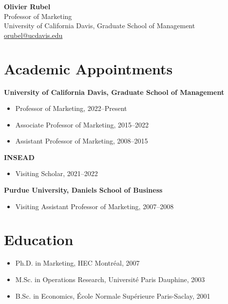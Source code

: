 \documentclass[10pt]{article}
\begin{document}

{\LARGE \textbf{Olivier  Rubel}}\\[-0.1em]
Professor of Marketing \\
University of California Davis, Graduate School of Management \\
\href{mailto:orubel@ucdavis.edu}{orubel@ucdavis.edu}

\vspace{0.8em}


\section{Academic Appointments}

\textbf{University of California Davis, Graduate School of Management}
\begin{itemize}
    \item[] Professor of Marketing, 2022--Present
    \item[] Associate Professor of Marketing, 2015--2022
    \item[] Assistant Professor of Marketing, 2008--2015
\end{itemize}

\textbf{INSEAD}
\begin{itemize}
    \item[] Visiting Scholar, 2021--2022
\end{itemize}

\textbf{Purdue University, Daniels School of Business}
\begin{itemize}
    \item[] Visiting Assistant Professor of Marketing, 2007--2008
\end{itemize}

\section{Education}

\begin{itemize}
    \item[] Ph.D. in Marketing, HEC Montr\'{e}al, 2007
    \item[] M.Sc. in Operations Research, Universit\'{e} Paris Dauphine, 2003
    \item[] B.Sc. in Economics, \'{E}cole Normale Sup\'{e}rieure Paris-Saclay, 2001
\end{itemize}
\end{document}
